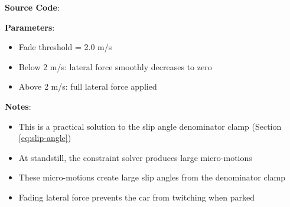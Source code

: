 \textbf{Source Code}: 

\textbf{Parameters}:
\begin{itemize}
  \item Fade threshold = 2.0 m/s
  \item Below 2 m/s: lateral force smoothly decreases to zero
  \item Above 2 m/s: full lateral force applied
\end{itemize}

\textbf{Notes}:
\begin{itemize}
  \item This is a practical solution to the slip angle denominator clamp (Section \ref{eq:slip-angle})
  \item At standstill, the constraint solver produces large micro-motions
  \item These micro-motions create large slip angles from the denominator clamp
  \item Fading lateral force prevents the car from twitching when parked
\end{itemize}

\newpage
